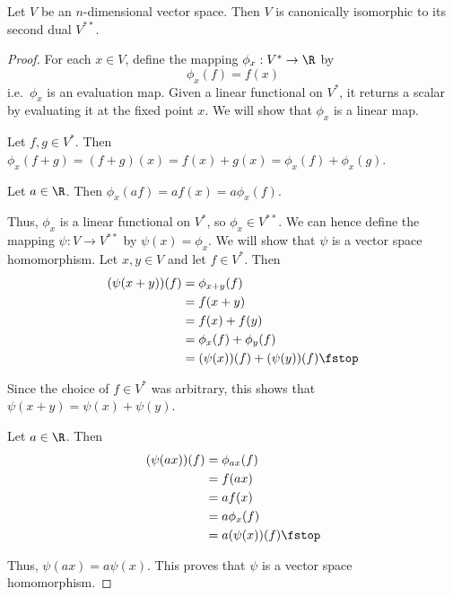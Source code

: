 \begin{theorem}
  Let \( V \) be an \( n \)-dimensional vector space. Then \( V \) is canonically isomorphic to its second dual \( V^{**} \).
\end{theorem}
\begin{proof}
  For each \( x\in V \), define the mapping \( \phi_x:V^*\to\R \) by
  \[ \phi_x(f)=f(x) \]
  i.e.\ \( \phi_x \) is an evaluation map. Given a linear functional on \( V^* \), it returns a scalar by evaluating it at the fixed point \( x \). We will show that \( \phi_x\) is a linear map.

  \vspace{3mm}

  Let \( f,g\in V^* \). Then \( \phi_x(f+g)=(f+g)(x)=f(x)+g(x)=\phi_x(f)+\phi_x(g) \).

  Let \( a\in\R \). Then \( \phi_x(af)=af(x)=a\phi_x(f) \).

  \vspace{3mm}

  Thus, \( \phi_x \) is a linear functional on \( V^* \), so \( \phi_x\in V^{**} \). We can hence define the mapping \( \psi:V\to V^{**} \) by \( \psi(x)=\phi_x \). We will show that \( \psi \) is a vector space homomorphism. Let \( x,y\in V \) and let \( f\in V^*\). Then
  \begin{align*}
    (\psi(x+y))(f)&= \phi_{x+y}(f)\\
    &= f(x+y)\\
    &= f(x)+f(y)\\
    &= \phi_x(f)+\phi_y(f)\\
    &= (\psi(x))(f)+(\psi(y))(f)\fstop
  \end{align*}
  
  Since the choice of \( f\in V^* \) was arbitrary, this shows that \( \psi(x+y)=\psi(x)+\psi(y) \).

  \vspace{3mm}

  Let \( a\in\R \). Then
  \begin{align*}
    (\psi(ax))(f)&= \phi_{ax}(f)\\
    &= f(ax)\\
    &= af(x)\\
    &= a\phi_x(f)\\
    &= a(\psi(x))(f)\fstop
  \end{align*}
  
  Thus, \( \psi(ax)=a\psi(x) \). This proves that \( \psi \) is a vector space homomorphism.

  \vspace{3mm}


\end{proof}
